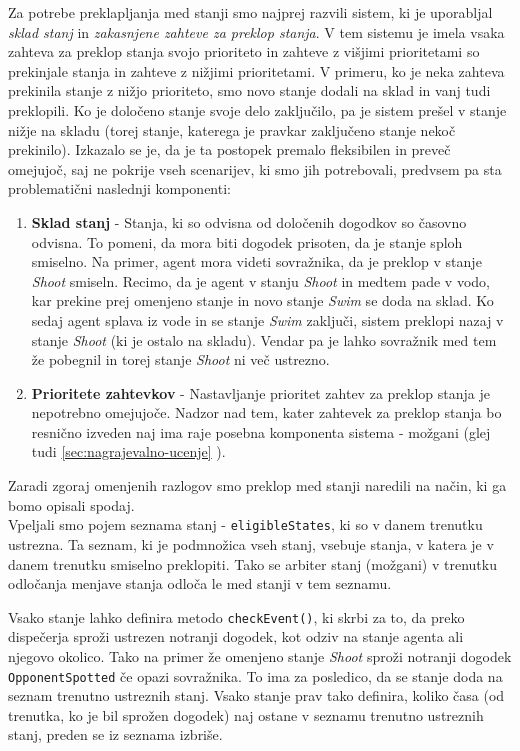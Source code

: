 \documentclass[a4paper,10pt]{article}
\begin{document}
Za potrebe preklapljanja med stanji smo najprej razvili sistem, ki je uporabljal \textit{sklad stanj} in \textit{zakasnjene zahteve za preklop stanja}. V tem sistemu je imela vsaka zahteva za preklop stanja svojo prioriteto in zahteve z višjimi prioritetami so prekinjale stanja in zahteve z nižjimi prioritetami. V primeru, ko je neka zahteva prekinila stanje z nižjo prioriteto, smo novo stanje dodali na sklad in vanj tudi preklopili. Ko je določeno stanje svoje delo zaključilo, pa je sistem prešel v stanje nižje na skladu (torej stanje, katerega je pravkar zaključeno stanje nekoč prekinilo). 
  Izkazalo se je, da je ta postopek premalo fleksibilen in preveč omejujoč, saj ne pokrije vseh scenarijev, ki smo jih potrebovali, predvsem pa sta problematični naslednji komponenti:
\begin{enumerate}
 \item \textbf{Sklad stanj} - Stanja, ki so odvisna od določenih dogodkov so časovno odvisna. To pomeni, da mora biti dogodek prisoten, da je stanje sploh smiselno. Na primer, agent mora videti sovražnika, da je preklop v stanje \textit{Shoot} smiseln. Recimo, da je agent v stanju \textit{Shoot} in medtem pade v vodo, kar prekine prej omenjeno stanje in novo stanje \textit{Swim} se doda na sklad. Ko sedaj agent splava iz vode in se stanje \textit{Swim} zaključi, sistem preklopi nazaj v stanje \textit{Shoot} (ki je ostalo na skladu). Vendar pa je lahko sovražnik med tem že pobegnil in torej stanje \textit{Shoot} ni več ustrezno. 
 \item \textbf{Prioritete zahtevkov} - Nastavljanje prioritet zahtev za preklop stanja je nepotrebno omejujoče. Nadzor nad tem, kater zahtevek za preklop stanja bo resnično izveden naj ima raje posebna komponenta sistema - možgani (glej tudi \ref{sec:nagrajevalno-ucenje} ).
\end{enumerate}

Zaradi zgoraj omenjenih razlogov smo preklop med stanji naredili na način, ki ga bomo opisali spodaj. \\

Vpeljali smo pojem seznama stanj - \texttt{eligibleStates}, ki so v danem trenutku ustrezna. Ta seznam, ki je podmnožica vseh stanj, vsebuje stanja, v katera je v danem trenutku smiselno preklopiti. Tako se arbiter stanj (možgani) v trenutku odločanja menjave stanja odloča le med stanji v tem seznamu. 

Vsako stanje lahko definira metodo \texttt{checkEvent()}, ki skrbi za to, da preko dispečerja sproži ustrezen notranji dogodek, kot odziv na stanje agenta ali njegovo okolico. Tako na primer že omenjeno stanje \textit{Shoot} sproži notranji dogodek \texttt{OpponentSpotted} če opazi sovražnika. To ima za posledico, da se stanje doda na seznam trenutno ustreznih stanj. Vsako stanje prav tako definira, koliko časa (od trenutka, ko je bil sprožen dogodek) naj ostane v seznamu trenutno ustreznih stanj, preden se iz seznama izbriše. \\
\end{document}
